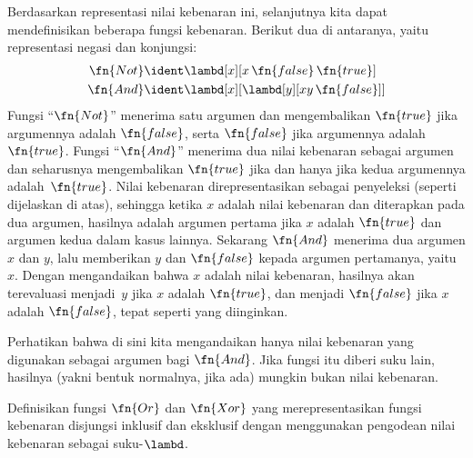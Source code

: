\documentclass[../../../include/open-logic-section]{subfiles}
\begin{document}
Berdasarkan representasi nilai kebenaran ini, selanjutnya kita dapat
mendefinisikan beberapa fungsi kebenaran. Berikut dua di antaranya, yaitu
representasi negasi dan konjungsi:
\begin{align*}
  \fn{Not} & \ident \lambd[x][x\, \fn{false}\, \fn{true}]\\
  \fn{And} & \ident \lambd[x][\lambd[y][xy \,\fn{false}]]
\end{align*}
Fungsi ``$\fn{Not}$'' menerima satu argumen dan mengembalikan $\fn{true}$ jika
argumennya adalah $\fn{false}$, serta $\fn{false}$ jika argumennya
adalah~$\fn{true}$. Fungsi ``$\fn{And}$'' menerima dua nilai kebenaran sebagai
argumen dan seharusnya mengembalikan $\fn{true}$ jika dan hanya jika kedua
argumennya adalah~$\fn{true}$. Nilai kebenaran direpresentasikan sebagai
penyeleksi (seperti dijelaskan di atas), sehingga ketika $x$ adalah nilai
kebenaran dan diterapkan pada dua argumen, hasilnya adalah argumen pertama jika
$x$ adalah $\fn{true}$ dan argumen kedua dalam kasus lainnya. Sekarang
$\fn{And}$ menerima dua argumen $x$ dan $y$, lalu memberikan $y$ dan
$\fn{false}$ kepada argumen pertamanya, yaitu~$x$. Dengan mengandaikan bahwa
$x$ adalah nilai kebenaran, hasilnya akan terevaluasi menjadi~$y$ jika $x$
adalah $\fn{true}$, dan menjadi $\fn{false}$ jika $x$ adalah $\fn{false}$,
tepat seperti yang diinginkan.

Perhatikan bahwa di sini kita mengandaikan hanya nilai kebenaran yang digunakan
sebagai argumen bagi $\fn{And}$. Jika fungsi itu diberi suku lain, hasilnya
(yakni bentuk normalnya, jika ada) mungkin bukan nilai kebenaran.

\begin{prob}
  Definisikan fungsi $\fn{Or}$ dan $\fn{Xor}$ yang merepresentasikan fungsi
  kebenaran disjungsi inklusif dan eksklusif dengan menggunakan pengodean nilai
  kebenaran sebagai suku-$\lambd$.
\end{prob}
\end{document}
